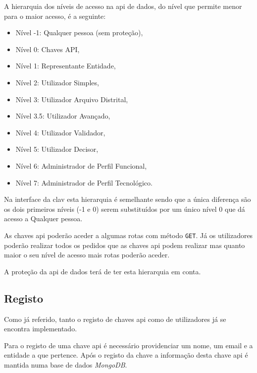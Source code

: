 A hierarquia dos níveis de acesso na \acrshort{api} de dados, do nível que permite menor para o maior acesso, é a seguinte:
\begin{itemize}
    \item Nível -1: Qualquer pessoa (sem proteção),
    \item Nível 0: Chaves API,
    \item Nível 1: Representante Entidade,
    \item Nível 2: Utilizador Simples,
    \item Nível 3: Utilizador Arquivo Distrital,
    \item Nível 3.5: Utilizador Avançado,
    \item Nível 4: Utilizador Validador,
    \item Nível 5: Utilizador Decisor,
    \item Nível 6: Administrador de Perfil Funcional,
    \item Nível 7: Administrador de Perfil Tecnológico.
\end{itemize}

Na interface da \acrshort{clav} esta hierarquia é semelhante sendo que a única diferença são os dois primeiros níveis (-1 e 0) serem substituídos por um único nível 0 que dá acesso a Qualquer pessoa.

As chaves \acrshort{api} poderão aceder a algumas rotas com método \texttt{GET}.
Já os utilizadores poderão realizar todos os pedidos que as chaves \acrshort{api} podem realizar mas quanto 
maior o seu nível de acesso mais rotas poderão aceder.

A proteção da \acrshort{api} de dados terá de ter esta hierarquia em conta.

\subsection{Registo}

Como já referido, tanto o registo de chaves \acrshort{api} como de utilizadores já se encontra implementado.

Para o registo de uma chave \acrshort{api} é necessário providenciar um nome, um email e a entidade a que pertence. 
Após o registo da chave a informação desta chave \acrshort{api} é mantida numa base de dados \textit{MongoDB}.

